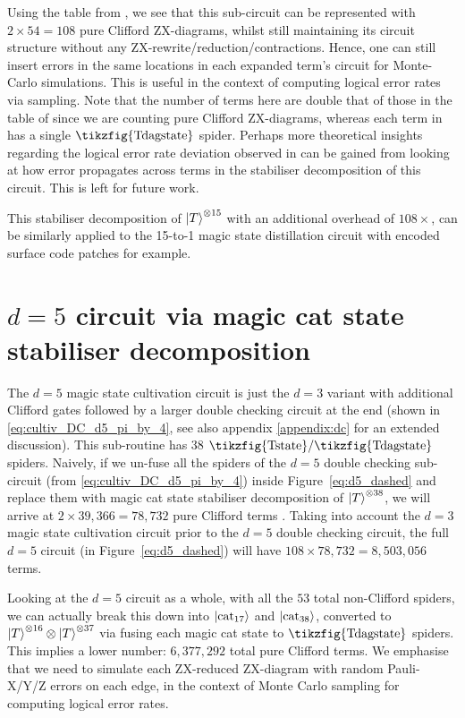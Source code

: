 \documentclass[a4paper,onecolumn,11pt,accepted=2026-06-10]{quantumarticle}
\begin{document}
Using the table from \cite[Table A.4]{Codsi2022Masters}, we  see that this sub-circuit can be represented with $2\times 54=108$ pure Clifford ZX-diagrams, whilst still maintaining its circuit structure without any ZX-rewrite/reduction/contractions. Hence, one can still insert errors in the same locations in each expanded term's circuit for Monte-Carlo simulations. This is useful in the context of computing logical error rates via sampling. Note that the number of terms here are double that of those in the table of \cite{Codsi2022Masters} since we are counting pure Clifford ZX-diagrams, whereas each term in \cite{Codsi2022Masters} has a single $\scalebox{1}{\tikzfig{Tdagstate}}$ spider. Perhaps more theoretical insights  regarding the logical error rate deviation observed in \cite{gidney2024magicstatecultivationgrowing} can be gained from looking at how error propagates across terms in the stabiliser decomposition of this circuit. This is left for future work. 

This stabiliser decomposition of $\ket{T}^{\otimes 15}$ with an additional overhead of $108\times$, can be similarly applied to the 15-to-1 magic state distillation circuit \cite{Bravyi_2005} with encoded surface code patches \cite{Litinski_2019} for example.

\section{$d=5$ circuit via magic cat state stabiliser decomposition}
The $d=5$ magic state cultivation circuit is just the $d=3$ variant with additional Clifford gates followed by a larger double checking circuit at the end (shown in \eqref{eq:cultiv_DC_d5_pi_by_4}, see also appendix \ref{appendix:dc} for an extended discussion). This sub-routine has $38$ $\scalebox{1}{\tikzfig{Tstate}}/\scalebox{1}{\tikzfig{Tdagstate}}$ spiders.
Naively, if we un-fuse all the spiders of the $d=5$ double checking sub-circuit (from \eqref{eq:cultiv_DC_d5_pi_by_4}) inside Figure~\ref{eq:d5_dashed} and replace them with magic cat state stabiliser decomposition of $\ket{T}^{\otimes 38}$, we will arrive at $2\times39{,}366 = 78{,}732$ pure Clifford terms \cite{Codsi2022Masters}. Taking into account the $d=3$ magic state cultivation circuit prior to the $d=5$ double checking circuit, the full $d=5$ circuit (in Figure~\ref{eq:d5_dashed}) will have $108\times 78{,}732=8{,}503{,}056$ terms. 

Looking at the $d=5$ circuit as a whole, with all the $53$ total non-Clifford spiders, we can actually break this down into $\ket{\text{cat}_{17}}$ and $\ket{\text{cat}_{38}}$, converted to $\ket{T}^{\otimes 16}\otimes\ket{T}^{\otimes 37}$ via fusing each magic cat state to $\scalebox{1}{\tikzfig{Tdagstate}}$ spiders. This implies  a lower number: $6{,}377{,}292$ total pure Clifford terms. We emphasise that we need to simulate each ZX-reduced ZX-diagram with random Pauli-X/Y/Z errors on each edge, in the context of Monte Carlo sampling for computing logical error rates. 
\end{document}

